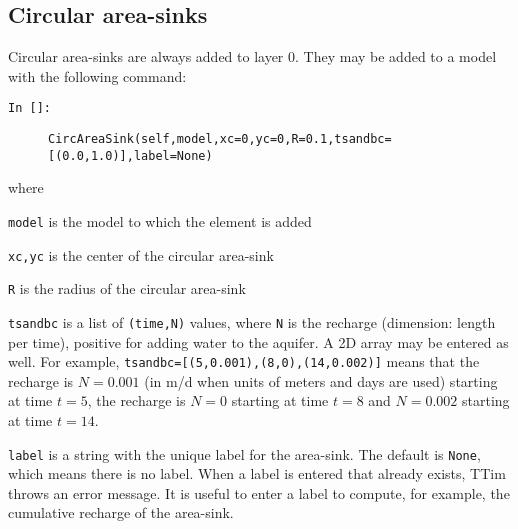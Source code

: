 \documentclass [10pt,letterpaper] {article}
\begin{document}
\subsection{Circular area-sinks}
Circular area-sinks are always added to layer 0. They may be added to a model with the following command:
\begin{description}
\item[{\tt In []:}]{\tt CircAreaSink(self,model,xc=0,yc=0,R=0.1,tsandbc=[(0.0,1.0)],label=None)}
\end{description}
where
\begin{description}
    \item {\tt model} is the model to which the element is
    added
    \item {\tt xc,yc} is the center of the circular area-sink
    \item {\tt R} is the radius of the circular area-sink
    \item {\tt tsandbc} is a list of {\tt (time,N)} values, where {\tt N} is the recharge (dimension: length per time), positive for adding water to the aquifer. A 2D array may be entered as well. For example, {\tt tsandbc=[(5,0.001),(8,0),(14,0.002)]} means that the recharge is $N=0.001$ (in m/d when units of meters and days are used) starting at time $t=5$, the recharge is $N=0$ starting at time $t=8$ and $N=0.002$ starting at time $t=14$.
    \item {\tt label} is a string with the unique label for the area-sink. The default is {\tt None}, which means there is no label. When a label is entered that already exists, TTim throws an error message. It is useful to enter a label to compute, for example, the cumulative recharge of the area-sink.
\end{description}
\end{document}
